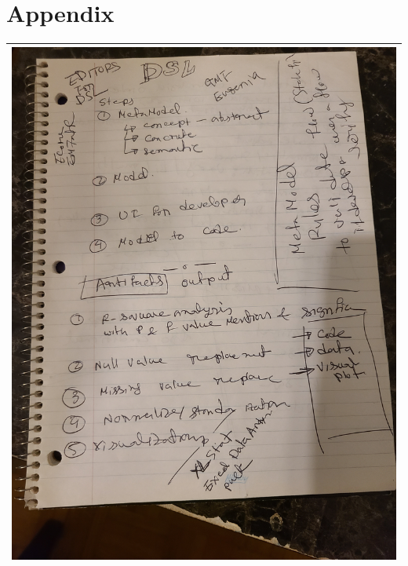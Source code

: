 \pagebreak
\section{Appendix}

\begin{tabular}{|c|}
\hline
\includegraphics[scale=0.1, angle = -90]{sketch/1.jpg} \\
\hline

\end{tabular}
